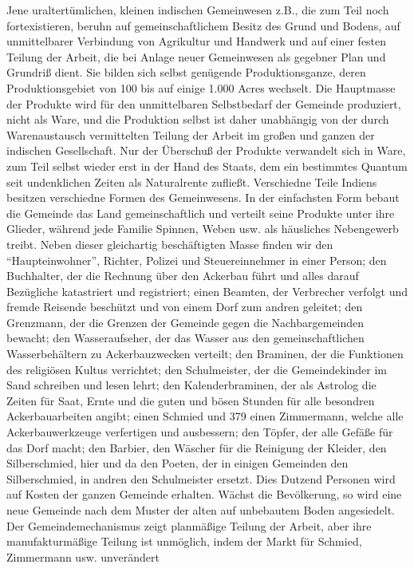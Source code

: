 {Jene uraltertümlichen, kleinen indischen Gemeinwesen z.B., die zum Teil
noch fortexistieren, beruhn auf gemeinschaftlichem Besitz des Grund und
Bodens, auf unmittelbarer Verbindung von Agrikultur und Handwerk und auf
einer festen Teilung der Arbeit, die bei Anlage neuer Gemeinwesen als
gegebner Plan und Grundriß dient. Sie bilden sich selbst genügende
Produktionsganze, deren Produktionsgebiet von 100 bis auf einige 1.000
Acres wechselt. Die Hauptmasse der Produkte wird für den unmittelbaren
Selbstbedarf der Gemeinde produziert, nicht als Ware, und die Produktion
selbst ist daher unabhängig von der durch Warenaustausch vermittelten
Teilung der Arbeit im großen und ganzen der indischen Gesellschaft. Nur
der Überschuß der Produkte verwandelt sich in Ware, zum Teil selbst
wieder erst in der Hand des Staats, dem ein bestimmtes Quantum seit
undenklichen Zeiten als Naturalrente zufließt. Verschiedne Teile Indiens
besitzen verschiedne Formen des Gemeinwesens. In der einfachsten Form
bebaut die Gemeinde das Land gemeinschaftlich und verteilt seine
Produkte unter ihre Glieder, während jede Familie Spinnen, Weben usw.
als häusliches Nebengewerb treibt. Neben dieser gleichartig
beschäftigten Masse finden wir den ``Haupteinwohner'', Richter, Polizei
und Steuereinnehmer in einer Person; den Buchhalter, der die Rechnung
über den Ackerbau führt und alles darauf Bezügliche katastriert und
registriert; einen Beamten, der Verbrecher verfolgt und fremde Reisende
beschützt und von einem Dorf zum andren geleitet; den Grenzmann, der die
Grenzen der Gemeinde gegen die Nachbargemeinden bewacht; den
Wasseraufseher, der das Wasser aus den gemeinschaftlichen
Wasserbehältern zu Ackerbauzwecken verteilt; den Braminen, der die
Funktionen des religiösen Kultus verrichtet; den Schulmeister, der die
Gemeindekinder im Sand schreiben und lesen lehrt; den Kalenderbraminen,
der als Astrolog die Zeiten für Saat, Ernte und die guten und bösen
Stunden für alle besondren Ackerbauarbeiten angibt; einen Schmied und
\num{379} einen Zimmermann, welche alle
Ackerbauwerkzeuge verfertigen und ausbessern; den Töpfer, der alle
Gefäße für das Dorf macht; den Barbier, den Wäscher für die Reinigung
der Kleider, den Silberschmied, hier und da den Poeten, der in einigen
Gemeinden den Silberschmied, in andren den Schulmeister ersetzt. Dies
Dutzend Personen wird auf Kosten der ganzen Gemeinde erhalten. Wächst
die Bevölkerung, so wird eine neue Gemeinde nach dem Muster der alten
auf unbebautem Boden angesiedelt. Der Gemeindemechanismus zeigt
planmäßige Teilung der Arbeit, aber ihre manufakturmäßige Teilung ist
unmöglich, indem der Markt für Schmied, Zimmermann usw. unverändert
}
